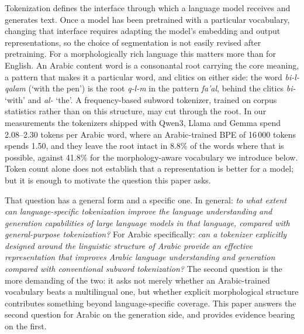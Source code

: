 \documentclass[a4paper,fleqn]{cas-sc}
\begin{document}
Tokenization defines the interface through which a language model receives and generates text. Once a model has been pretrained with a particular vocabulary, changing that interface requires adapting the model's embedding and output representations, so the choice of segmentation is not easily revised after pretraining. For a morphologically rich language this matters more than for English. An Arabic content word is a consonantal root carrying the core meaning, a pattern that makes it a particular word, and clitics on either side: the word \emph{bi-l-qalam} (`with the pen') is the root \emph{q-l-m} in the pattern \emph{fa'al}, behind the clitics \emph{bi-} `with' and \emph{al-} `the'. A frequency-based subword tokenizer, trained on corpus statistics rather than on this structure, may cut through the root. In our measurements the tokenizers shipped with Qwen3, Llama and Gemma spend 2.08--2.30 tokens per Arabic word, where an Arabic-trained BPE of 16\,000 tokens spends 1.50, and they leave the root intact in 8.8\% of the words where that is possible, against 41.8\% for the morphology-aware vocabulary we introduce below. Token count alone does not establish that a representation is better for a model; but it is enough to motivate the question this paper asks.

That question has a general form and a specific one. In general: \emph{to what extent can language-specific tokenization improve the language understanding and generation capabilities of large language models in that language, compared with general-purpose tokenization?} For Arabic specifically: \emph{can a tokenizer explicitly designed around the linguistic structure of Arabic provide an effective representation that improves Arabic language understanding and generation compared with conventional subword tokenization?} The second question is the more demanding of the two: it asks not merely whether an Arabic-trained vocabulary beats a multilingual one, but whether explicit morphological structure contributes something beyond language-specific coverage. This paper answers the second question for Arabic on the generation side, and provides evidence bearing on the first.
\end{document}
